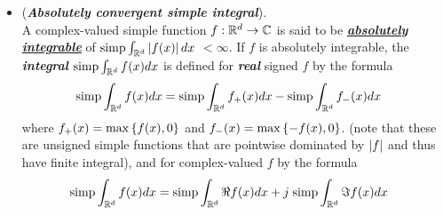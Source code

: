 \documentclass[11pt]{article}
\begin{document}
\begin{itemize}
\begin{proof}
\begin{itemize}
Since Lebesgue measure is nonnegative,  and $c_{i}\ge 0$ for all $1\le i\le k$, the above holds if and only if $c_{i}m(E_{i})=0$ for $1\le i\le k$. Then except for the null set that $m(E_{i}) = 0$, the coefficient $c_{i}=0$ for all $i$. It means that $f=0,\; a.e.$. 

\item Proof of \emph{4. Equivalence} Let $f(x) = \sum_{i=1}^{k}c_{i}\ind{x\in E_{i}}$ and $g(x) = \sum_{j=1}^{m}d_{j}\ind{x\in F_{j}}$. Without loss of generality, assume $E_{i}\neq \emptyset$ for all $i$ and $F_{j}\neq \emptyset$.  
\begin{align*}
&\text{simp}\int_{\bR^{d}}f(x) dx - \text{simp}\int_{\bR^{d}}g(x) dx\\
&= \text{simp}\int_{\bR^{d}} (f(x) -g(x)) dx\\
&= \sum_{i=1}^{k}\sum_{j=1}^{m}(c_{i}-d_{j})m(E_{i}\cap F_{j})+ \sum_{i=1}^{k}c_{i}m\paren{E_{i}/\bigcup_{j=1}^{m}F_{j}}
- \sum_{j=1}^{m}d_{j}m\paren{F_{j}/\bigcup_{i=1}^{k}E_{i}}
\end{align*}
If $f=g, a.e.$, or $f-g=0, a.e.$. In other word, for $E_{i}\cap F_{j}\neq \emptyset$, either $m(E_{i}\cap F_{j})=0$ or $c_{i}= d_{j}$. For $m(E_{i}/\bigcup_{j=1}^{m}F_{j}) \neq 0$, $c_{i}=0$ and $m(F_{j}/\bigcup_{i=1}^{k}E_{j})\neq 0$, $d_{j}=0$. In indicates that the above integral is zero. \qed
\end{itemize}
\end{proof}



\item \begin{definition} (\emph{\textbf{Absolutely convergent simple integral}}). \\
A complex-valued simple function $f : {\mathbb R}^d \rightarrow  {\mathbb C}$ is said to be \underline{\emph{\textbf{absolutely integrable}}} of $\text{simp}\int_{{\mathbb R}^d }\left\lvert f(x) \right\rvert dx$ $ < \infty$. If $f$ is absolutely integrable, the \emph{\textbf{integral}} $\text{simp}\int_{{\mathbb R}^d }f(x)dx$ is defined for \emph{\textbf{real}} signed $f$ by the formula
\begin{align*}
\text{simp}\int_{{\mathbb R}^d }f(x)dx &= \text{simp}\int_{{\mathbb R}^d }f_{+}(x)dx - \text{simp}\int_{{\mathbb R}^d }f_{-}(x)dx
\end{align*}
where $f_{+}(x) = \max\left\{f(x), 0\right\}$ and $f_{-}(x) = \max\left\{-f(x), 0\right\}$. (note that these are unsigned simple functions that are pointwise dominated by $\left\lvert f \right\rvert$ and thus have finite integral), and for complex-valued $f$ by the formula
\begin{align*}
\text{simp}\int_{{\mathbb R}^d }f(x)dx &= \text{simp}\int_{{\mathbb R}^d }\Re f(x)dx + j\;\text{simp}\int_{{\mathbb R}^d }\Im f(x)dx
\end{align*}
\end{definition}


\end{itemize}
\end{document}
